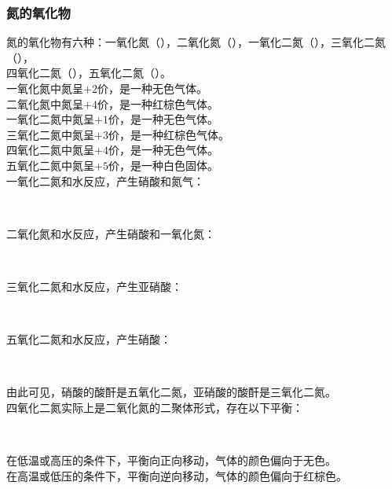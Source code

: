\documentclass[UTF8]{ctexart}
\begin{document}
\subsubsection{氮的氧化物}
    氮的氧化物有六种：一氧化氮（），二氧化氮（），一氧化二氮（），三氧化二氮（），\\[1mm]
    四氧化二氮（），五氧化二氮（）。\\[6mm]
    一氧化氮中氮呈$+2$价，是一种无色气体。\\[3mm]
    二氧化氮中氮呈$+4$价，是一种红棕色气体。\\[6mm]
    一氧化二氮中氮呈$+1$价，是一种无色气体。\\[3mm]
    三氧化二氮中氮呈$+3$价，是一种红棕色气体。\\[3mm]
    四氧化二氮中氮呈$+4$价，是一种无色气体。\\[3mm]
    五氧化二氮中氮呈$+5$价，是一种白色固体。\\[6mm]
    一氧化二氮和水反应，产生硝酸和氮气：
    \begin{center}
        \\[4mm]
    \end{center}
    二氧化氮和水反应，产生硝酸和一氧化氮：
    \begin{center}
        \\[4mm]
    \end{center}
    三氧化二氮和水反应，产生亚硝酸：
    \begin{center}
        \\[4mm]
    \end{center}
    五氧化二氮和水反应，产生硝酸：
    \begin{center}
        \\[4mm]
    \end{center}
    由此可见，硝酸的酸酐是五氧化二氮，亚硝酸的酸酐是三氧化二氮。\\[10mm]
    四氧化二氮实际上是二氧化氮的二聚体形式，存在以下平衡：
    \begin{center}
        \\[4mm]
    \end{center}
    在低温或高压的条件下，平衡向正向移动，气体的颜色偏向于无色。\\[3mm]
    在高温或低压的条件下，平衡向逆向移动，气体的颜色偏向于红棕色。

\newpage
\end{document}
